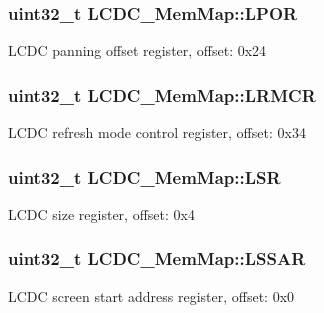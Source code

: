 \subsubsection[{L\+P\+O\+R}]{\setlength{\rightskip}{0pt plus 5cm}uint32\+\_\+t L\+C\+D\+C\+\_\+\+Mem\+Map\+::\+L\+P\+O\+R}\label{struct_l_c_d_c___mem_map_ad2600d7c7ec0833a8b9089da675254b6}
L\+C\+D\+C panning offset register, offset\+: 0x24 \hypertarget{struct_l_c_d_c___mem_map_af3fc91dbd55df2dea9e83efe76f4d09d}{}
\subsubsection[{L\+R\+M\+C\+R}]{\setlength{\rightskip}{0pt plus 5cm}uint32\+\_\+t L\+C\+D\+C\+\_\+\+Mem\+Map\+::\+L\+R\+M\+C\+R}\label{struct_l_c_d_c___mem_map_af3fc91dbd55df2dea9e83efe76f4d09d}
L\+C\+D\+C refresh mode control register, offset\+: 0x34 \hypertarget{struct_l_c_d_c___mem_map_a6edf826456a2431e94e3bcafcfe89867}{}
\subsubsection[{L\+S\+R}]{\setlength{\rightskip}{0pt plus 5cm}uint32\+\_\+t L\+C\+D\+C\+\_\+\+Mem\+Map\+::\+L\+S\+R}\label{struct_l_c_d_c___mem_map_a6edf826456a2431e94e3bcafcfe89867}
L\+C\+D\+C size register, offset\+: 0x4 \hypertarget{struct_l_c_d_c___mem_map_a56099c0d6e2b6c8d677a9f2bdd84706f}{}
\subsubsection[{L\+S\+S\+A\+R}]{\setlength{\rightskip}{0pt plus 5cm}uint32\+\_\+t L\+C\+D\+C\+\_\+\+Mem\+Map\+::\+L\+S\+S\+A\+R}\label{struct_l_c_d_c___mem_map_a56099c0d6e2b6c8d677a9f2bdd84706f}
L\+C\+D\+C screen start address register, offset\+: 0x0 \hypertarget{struct_l_c_d_c___mem_map_a865c74a990435ca94ba226f23894d8e7}{}
